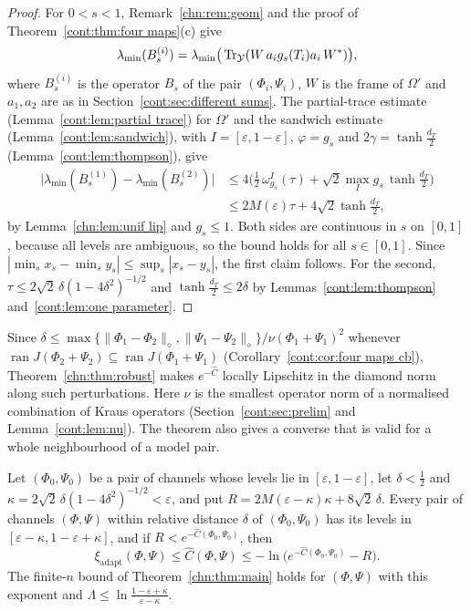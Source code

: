 \begin{proof}
For $0<s<1$, Remark~\ref{chn:rem:geom} and the proof of Theorem~\ref{cont:thm:four maps}(c) give
\[
\lambda_{\min}(B_s^{(i)})=\lambda_{\min}\big(\operatorname{Tr}_{\mathcal Y}(W\,a_ig_s(T_i)a_i\,W^*)\big),
\]
where $B_s^{(i)}$ is the operator $B_s$ of the pair $(\Phi_i,\Psi_i)$, $W$ is the frame of $\Omega'$ and $a_1,a_2$ are as in Section~\ref{cont:sec:different sums}. The partial-trace estimate (Lemma~\ref{cont:lem:partial trace}) for $\Omega'$ and the sandwich estimate (Lemma~\ref{cont:lem:sandwich}), with $I=[\varepsilon,1-\varepsilon]$, $\varphi=g_s$ and $2\gamma=\tanh\frac{d_T}2$ (Lemma~\ref{cont:lem:thompson}), give
\[
\begin{aligned}
\big|\lambda_{\min}(B_s^{(1)})-\lambda_{\min}(B_s^{(2)})\big|&\le4\Big(\tfrac12\,\omega^I_{g_s}(\tau)+\sqrt2\max_I g_s\,\tanh\tfrac{d_T}2\Big)\\
&\le2M(\varepsilon)\tau+4\sqrt2\tanh\tfrac{d_T}2,
\end{aligned}
\]
by Lemma~\ref{chn:lem:unif lip} and $g_s\le1$. Both sides are continuous in $s$ on $[0,1]$, because all levels are ambiguous, so the bound holds for all $s\in[0,1]$. Since $|\min_sx_s-\min_sy_s|\le\sup_s|x_s-y_s|$, the first claim follows. For the second, $\tau\le2\sqrt2\,\delta(1-4\delta^2)^{-1/2}$ and $\tanh\frac{d_T}2\le2\delta$ by Lemmas~\ref{cont:lem:thompson} and~\ref{cont:lem:one parameter}.
\end{proof}

Since $\delta\le\max\{\|\Phi_1-\Phi_2\|_\diamond,\|\Psi_1-\Psi_2\|_\diamond\}/\nu(\Phi_1+\Psi_1)^2$ whenever $\operatorname{ran}J(\Phi_2+\Psi_2)\subseteq\operatorname{ran}J(\Phi_1+\Psi_1)$ (Corollary~\ref{cont:cor:four maps cb}), Theorem~\ref{chn:thm:robust} makes $e^{-\widehat C}$ locally Lipschitz in the diamond norm along such perturbations. Here $\nu$ is the smallest operator norm of a normalised combination of Kraus operators (Section~\ref{cont:sec:prelim} and Lemma~\ref{cont:lem:nu}). The theorem also gives a converse that is valid for a whole neighbourhood of a model pair.

\begin{corollary}\label{chn:cor:uncertain}
Let $(\Phi_0,\Psi_0)$ be a pair of channels whose levels lie in $[\varepsilon,1-\varepsilon]$, let $\delta<\frac12$ and $\kappa=2\sqrt2\,\delta(1-4\delta^2)^{-1/2}<\varepsilon$, and put $R=2M(\varepsilon-\kappa)\kappa+8\sqrt2\,\delta$. Every pair of channels $(\Phi,\Psi)$ within relative distance $\delta$ of $(\Phi_0,\Psi_0)$ has its levels in $[\varepsilon-\kappa,1-\varepsilon+\kappa]$, and if $R<e^{-\widehat C(\Phi_0,\Psi_0)}$, then
\[
\xi_{\mathrm{adapt}}(\Phi,\Psi)\le\widehat C(\Phi,\Psi)\le-\ln\big(e^{-\widehat C(\Phi_0,\Psi_0)}-R\big).
\]
The finite-$n$ bound of Theorem~\ref{chn:thm:main} holds for $(\Phi,\Psi)$ with this exponent and $\Lambda\le\ln\frac{1-\varepsilon+\kappa}{\varepsilon-\kappa}$.
\end{corollary}

